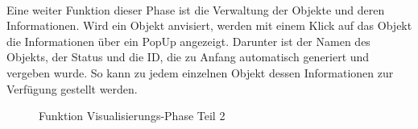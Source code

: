 \pagebreak
\\
Eine weiter Funktion dieser Phase ist die Verwaltung der Objekte und deren Informationen. Wird ein Objekt anvisiert, werden mit einem Klick auf das Objekt 
die Informationen über ein PopUp angezeigt. Darunter ist der Namen des Objekts, der Status und die ID, die zu Anfang automatisch generiert 
und vergeben wurde. So kann zu jedem einzelnen Objekt dessen Informationen zur Verfügung gestellt werden. 
\begin{figure}[hbt!]
    \centering
    \caption{Funktion Visualisierungs-Phase Teil 2}
    \label{pic:showdatatoobj}
\end{figure}
